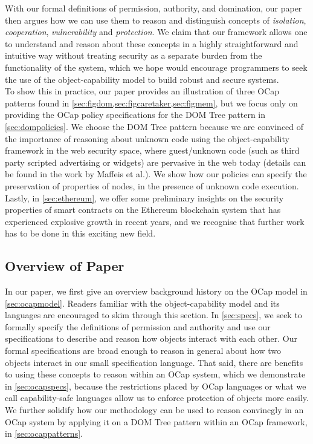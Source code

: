 \documentclass[a4paper,11pt,twoside]{article}
\begin{document}
With our formal definitions of permission, authority, and domination, our paper then argues how we can use them to reason and distinguish concepts of \textit{isolation}, \textit{cooperation}, \textit{vulnerability} and \textit{protection}. We claim that our framework allows one to understand and reason about these concepts in a highly straightforward and intuitive way without treating security as a separate burden from the functionality of the system, which we hope would encourage programmers to seek the use of the object-capability model to build robust and secure systems.\\



To show this in practice, our paper provides an illustration of three OCap patterns found in \cref{sec:figdom,sec:figcaretaker,sec:figmem}, but we focus only on providing the OCap policy specifications for the DOM Tree pattern in \cref{sec:dompolicies}. We choose the DOM Tree pattern because we are convinced of the importance of reasoning about unknown code using the object-capability framework in the web security space, where guest/unknown code (such as third party scripted advertising or widgets) are pervasive in the web today (details can be found in the work by Maffeis et al.\cite{maffeis2010}). We show how our policies can specify the preservation of properties of nodes, in the presence of unknown code execution. Lastly, in \cref{sec:ethereum}, we offer some preliminary insights on the security properties of smart contracts on the Ethereum blockchain system that has experienced explosive growth in recent years, and we recognise that further work has to be done in this exciting new field.

\subsection{Overview of Paper}
In our paper, we first give an overview background history on the OCap model in \cref{sec:ocapmodel}. Readers familiar with the object-capability model and its languages are encouraged to skim through this section. In \cref{sec:specs}, we seek to formally specify the definitions of permission and authority and use our specifications to describe and reason how objects interact with each other. Our formal specifications are broad enough to reason in general about how two objects interact in our small specification language. That said, there are benefits to using these concepts to reason within an OCap system, which we demonstrate in \cref{sec:ocapspecs}, because the restrictions placed by OCap languages or what we call capability-safe languages allow us to enforce protection of objects more easily. We further solidify how our methodology can be used to reason convincgly in an OCap system by applying it on a DOM Tree pattern within an OCap framework, in \cref{sec:ocappatterns}.
\end{document}
